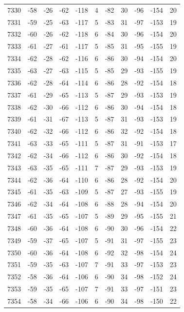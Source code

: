 \begin{table}[H]
\begin{tabular}{lllllllllll}
7330 & -58 & -26 & -62 & -118 & 4 & -82 & 30 & -96 & -154 & 20 \\
7331 & -59 & -25 & -63 & -117 & 5 & -83 & 31 & -97 & -153 & 19 \\
7332 & -60 & -26 & -62 & -118 & 6 & -84 & 30 & -96 & -154 & 20 \\
7333 & -61 & -27 & -61 & -117 & 5 & -85 & 31 & -95 & -155 & 19 \\
7334 & -62 & -28 & -62 & -116 & 6 & -86 & 30 & -94 & -154 & 20 \\
7335 & -63 & -27 & -63 & -115 & 5 & -85 & 29 & -93 & -155 & 19 \\
7336 & -62 & -28 & -64 & -114 & 6 & -86 & 28 & -92 & -154 & 18 \\
7337 & -61 & -29 & -65 & -113 & 5 & -87 & 29 & -93 & -153 & 19 \\
7338 & -62 & -30 & -66 & -112 & 6 & -86 & 30 & -94 & -154 & 18 \\
7339 & -61 & -31 & -67 & -113 & 5 & -87 & 31 & -93 & -153 & 19 \\
7340 & -62 & -32 & -66 & -112 & 6 & -86 & 32 & -92 & -154 & 18 \\
7341 & -63 & -33 & -65 & -111 & 5 & -87 & 31 & -91 & -153 & 17 \\
7342 & -62 & -34 & -66 & -112 & 6 & -86 & 30 & -92 & -154 & 18 \\
7343 & -63 & -35 & -65 & -111 & 7 & -87 & 29 & -93 & -153 & 19 \\
7344 & -62 & -36 & -64 & -110 & 6 & -86 & 28 & -92 & -154 & 20 \\
7345 & -61 & -35 & -63 & -109 & 5 & -87 & 27 & -93 & -155 & 19 \\
7346 & -62 & -34 & -64 & -108 & 6 & -88 & 28 & -94 & -154 & 20 \\
7347 & -61 & -35 & -65 & -107 & 5 & -89 & 29 & -95 & -155 & 21 \\
7348 & -60 & -36 & -64 & -108 & 6 & -90 & 30 & -96 & -154 & 22 \\
7349 & -59 & -37 & -65 & -107 & 5 & -91 & 31 & -97 & -155 & 23 \\
7350 & -60 & -36 & -64 & -108 & 6 & -92 & 32 & -98 & -154 & 24 \\
7351 & -59 & -35 & -63 & -107 & 7 & -91 & 33 & -97 & -153 & 23 \\
7352 & -58 & -36 & -64 & -106 & 6 & -90 & 34 & -98 & -152 & 24 \\
7353 & -59 & -35 & -65 & -107 & 7 & -91 & 33 & -97 & -151 & 23 \\
7354 & -58 & -34 & -66 & -106 & 6 & -90 & 34 & -98 & -150 & 22 \\

\end{tabular}
\end{table}
